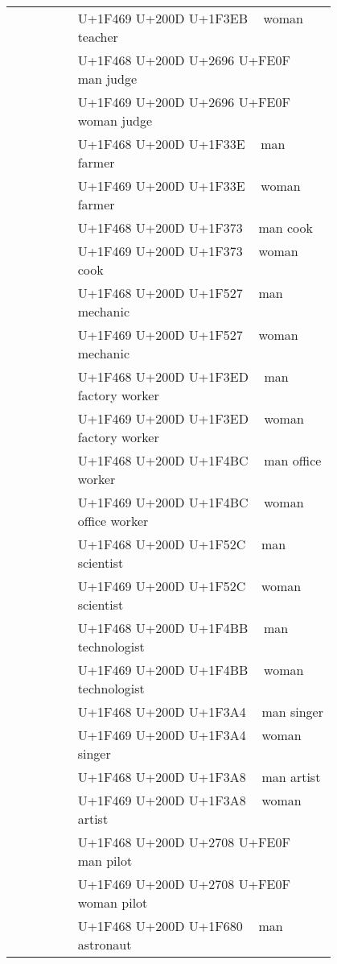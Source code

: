 \documentclass[a4paper,12pt]{ltjarticle}
\newcommand{\fontA}[1]{{\fontspec[RawFeature={mode=harf,+dist,+ccmp}]{Segoe UI Emoji} #1}}
\newcommand{\fontB}[1]{{\fontspec[RawFeature={mode=harf,+dist,+ccmp}]{Noto Color Emoji} #1}}
\begin{document}
\begin{longtable}[c]{ccp{0.8\linewidth}}
\fontA{👩‍🏫}&\fontB{👩‍🏫}&U+1F469 U+200D U+1F3EB 👩‍🏫 woman teacher\\
\fontA{👨‍⚖️}&\fontB{👨‍⚖️}&U+1F468 U+200D U+2696 U+FE0F 👨‍⚖️ man judge\\
\fontA{👩‍⚖️}&\fontB{👩‍⚖️}&U+1F469 U+200D U+2696 U+FE0F 👩‍⚖️ woman judge\\
\fontA{👨‍🌾}&\fontB{👨‍🌾}&U+1F468 U+200D U+1F33E 👨‍🌾 man farmer\\
\fontA{👩‍🌾}&\fontB{👩‍🌾}&U+1F469 U+200D U+1F33E 👩‍🌾 woman farmer\\
\fontA{👨‍🍳}&\fontB{👨‍🍳}&U+1F468 U+200D U+1F373 👨‍🍳 man cook\\
\fontA{👩‍🍳}&\fontB{👩‍🍳}&U+1F469 U+200D U+1F373 👩‍🍳 woman cook\\
\fontA{👨‍🔧}&\fontB{👨‍🔧}&U+1F468 U+200D U+1F527 👨‍🔧 man mechanic\\
\fontA{👩‍🔧}&\fontB{👩‍🔧}&U+1F469 U+200D U+1F527 👩‍🔧 woman mechanic\\
\fontA{👨‍🏭}&\fontB{👨‍🏭}&U+1F468 U+200D U+1F3ED 👨‍🏭 man factory worker\\
\fontA{👩‍🏭}&\fontB{👩‍🏭}&U+1F469 U+200D U+1F3ED 👩‍🏭 woman factory worker\\
\fontA{👨‍💼}&\fontB{👨‍💼}&U+1F468 U+200D U+1F4BC 👨‍💼 man office worker\\
\fontA{👩‍💼}&\fontB{👩‍💼}&U+1F469 U+200D U+1F4BC 👩‍💼 woman office worker\\
\fontA{👨‍🔬}&\fontB{👨‍🔬}&U+1F468 U+200D U+1F52C 👨‍🔬 man scientist\\
\fontA{👩‍🔬}&\fontB{👩‍🔬}&U+1F469 U+200D U+1F52C 👩‍🔬 woman scientist\\
\fontA{👨‍💻}&\fontB{👨‍💻}&U+1F468 U+200D U+1F4BB 👨‍💻 man technologist\\
\fontA{👩‍💻}&\fontB{👩‍💻}&U+1F469 U+200D U+1F4BB 👩‍💻 woman technologist\\
\fontA{👨‍🎤}&\fontB{👨‍🎤}&U+1F468 U+200D U+1F3A4 👨‍🎤 man singer\\
\fontA{👩‍🎤}&\fontB{👩‍🎤}&U+1F469 U+200D U+1F3A4 👩‍🎤 woman singer\\
\fontA{👨‍🎨}&\fontB{👨‍🎨}&U+1F468 U+200D U+1F3A8 👨‍🎨 man artist\\
\fontA{👩‍🎨}&\fontB{👩‍🎨}&U+1F469 U+200D U+1F3A8 👩‍🎨 woman artist\\
\fontA{👨‍✈️}&\fontB{👨‍✈️}&U+1F468 U+200D U+2708 U+FE0F 👨‍✈️ man pilot\\
\fontA{👩‍✈️}&\fontB{👩‍✈️}&U+1F469 U+200D U+2708 U+FE0F 👩‍✈️ woman pilot\\
\fontA{👨‍🚀}&\fontB{👨‍🚀}&U+1F468 U+200D U+1F680 👨‍🚀 man astronaut\\

\end{longtable}
\end{document}

